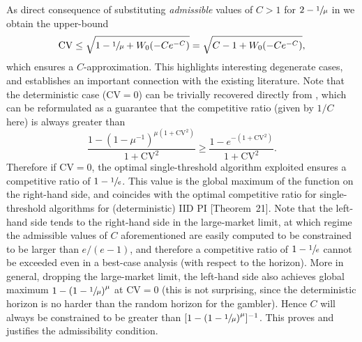 \documentclass[11pt, a4paper, twoside]{article}
\numberwithin{equation}{section}
\begin{document}
	As direct consequence of substituting \textit{admissible} values of $C>1$ for $2-\sfrac{1}{\mu}$ in  we obtain the upper-bound \[\text{CV}\le\sqrt{1-\sfrac{1}{\mu}+W_0(-Ce^{-C})}=\sqrt{C-1+W_0(-Ce^{-C})},\] which ensures a $C$-approximation. This highlights interesting degenerate cases, and establishes an important connection with the existing literature. Note that the deterministic case ($\text{CV}=0$) can be trivially recovered directly from , which can be reformulated as a guarantee that the competitive ratio (given by $1/C$ here) is always greater than \[\frac{1-\left(1-\mu^{-1}\right)^{\mu(1+\text{CV}^2)}}{1+\text{CV}^2}\ge\frac{1-e^{-(1+\text{CV}^2)}}{1+\text{CV}^2}.\]
	Therefore if $\text{CV}=0$, the optimal single-threshold algorithm exploited ensures a competitive ratio of $1-\sfrac{1}{e}$. This value is the global maximum of the function on the right-hand side, and coincides with the optimal competitive ratio for single-threshold algorithms for (deterministic) IID PI \cite{Esh18}[Theorem~21]. Note that the left-hand side tends to the right-hand side in the large-market limit, at which regime the admissible values of $C$ aforementioned are easily computed to be constrained to be larger than $e/(e-1)$, and therefore a competitive ratio of $1-\sfrac{1}{e}$ cannot be exceeded even in a best-case analysis (with respect to the horizon). More in general, dropping the large-market limit, the left-hand side also achieves global maximum $1-\left(1-\sfrac{1}{\mu}\right)^{\mu}$ at $\text{CV}=0$ (this is not surprising, since the deterministic horizon is no harder than the random horizon for the gambler). Hence $C$ will always be constrained to be greater than $[1-\left(1-\sfrac{1}{\mu}\right)^{\mu}]^{-1}$. This proves  and justifies the admissibility condition.
\end{document}
